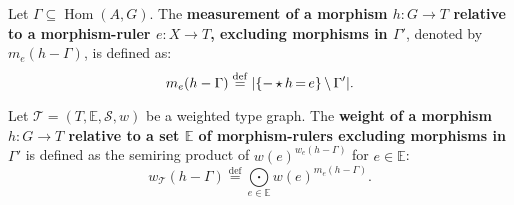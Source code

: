 \begin{definition} 
    \label{def:weight_excluding_pre}
    Let \( \Gamma \mathop{\subseteq} \operatorname{Hom}(A, G) \).
    The \textbf{measurement of a morphism \( h:G \mathop{\to} T \) relative to a morphism-ruler \( e: X \mathop{\to} T \), excluding morphisms in \( \Gamma' \)}, denoted by $m_e(h-\Gamma)$, is defined as:
    \[
        m_e(h-\Gamma) \overset{\operatorname{def}}{=} 
            |\{- \mathop{\star} h \mathop{=} e\} \mathop{\setminus} \Gamma'|.
    \]
\end{definition}
\begin{definition}
    \label{def:weight_excluding}
    Let $\mathcal{T}=(T,\mathbb{E},\mathcal{S},w)$ be a weighted type graph. The \textbf{weight of a morphism $h: G \mathop{\to} T$ relative to a set $\mathbb{E}$ of morphism-rulers excluding morphisms in \( \Gamma' \)} is defined as the semiring product of $w(e)^{w_e(h-\Gamma)}$ for $e \mathop{\in} \mathbb{E}$:
    \[ 
        w_\mathcal{T}(h-\Gamma) \overset{\operatorname{def}}{=} \underset{e \mathop{\in} \mathbb{E}}{\mathop{\bigodot}} 
    w(e)^{m_e(h-\Gamma)}.
            \]
\end{definition}

